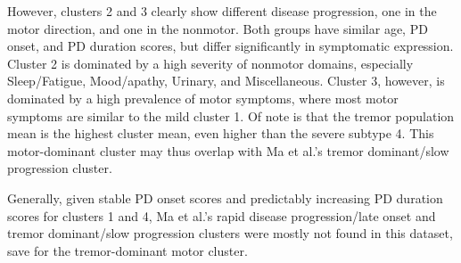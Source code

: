 \documentclass[preprint,5p]{elsarticle} %
\begin{document}
However, clusters 2 and 3 clearly show different disease progression, one in
the motor direction, and one in the nonmotor. Both groups have similar age,
PD onset, and PD duration scores, but differ significantly in symptomatic expression.
Cluster 2 is dominated by a high severity of nonmotor domains, especially Sleep/Fatigue,
Mood/apathy, Urinary, and Miscellaneous.  Cluster 3, however, is dominated by a high prevalence
of motor symptoms, where most motor symptoms are similar to the mild cluster 1. Of note is that the
tremor population mean is the highest cluster mean, even higher than the severe subtype 4. This
motor-dominant cluster may thus overlap with Ma et al.'s tremor dominant/slow progression
cluster.\cite{ma15}

Generally, given stable PD onset scores and predictably increasing PD duration
scores for clusters 1 and 4, Ma et al.'s rapid disease
progression/late onset and tremor dominant/slow progression clusters were mostly not found in this
dataset, save for the tremor-dominant motor cluster.



\end{document}
